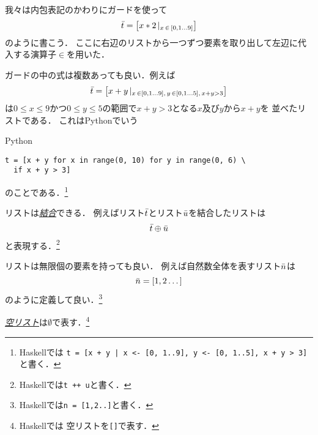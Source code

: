 \documentclass[a5paper,draft]{jsbook}
\newcommand{\programminglanguage}[1]{\textsf{#1}}
\newcommand{\haskell}{\programminglanguage{Haskell}}
\newcommand{\python}{\programminglanguage{Python}}
\newcommand{\keyword}[1]{{\underline{\emph{#1}}}}
\newcommand{\code}[1]{\texttt{#1}}
\newenvironment{pythoncode}{\begin{itembox}[r]{\python}}{\end{itembox}}
\newcommand{\pthnId}[1]{\textit{#1}}
\newcommand{\pthnKeyword}[1]{\textbf{#1}}
\newcommand{\pthnOp}[1]{\texttt{#1}}
\newcommand{\mathListVar}[1]{\Bar{#1}}
\newcommand{\mathGuard}[1]{\mathop{\mid_{#1}}}
\newcommand{\mathBinaryOperator}[1]{\operatorname{#1}}
\newcommand{\mathAppend}{\oplus}
\newcommand{\mathFrom}{\mathBinaryOperator{\in}}
\newcommand{\hsklEmptyList}{\emptyset}
\begin{document}
我々は内包表記のかわりにガードを使って
\begin{equation}
\mathListVar{t}=\left[x*2\mathGuard{x\mathFrom{[0,1\dots9]}}\right]
\end{equation}
のように書こう．
ここに右辺のリストから一つずつ要素を取り出して左辺に代入する演算子$\mathFrom$を用いた．

ガードの中の式は複数あっても良い．例えば
\begin{equation}
\mathListVar{t}=\left[x+y\mathGuard{x\mathFrom[0,1\dots9],\,y\mathFrom[0,1\dots5],\,x+y>3}\right]
\end{equation}
は$0\le x\le9$かつ$0\le y\le5$の範囲で$x+y>3$となる$x$及び$y$から$x+y$を
並べたリストである．
これは\python でいう
\begin{pythoncode}
\begin{verbatim}
t = [x + y for x in range(0, 10) for y in range(0, 6) \
  if x + y > 3]
\end{verbatim}
\end{pythoncode}
のことである．\footnote{\haskell では
\code{t = [x + y | x <- [0, 1..9], y <- [0, 1..5], x + y > 3]}と書く．}

リストは\keyword{結合}できる．
例えばリスト$\mathListVar{t}$とリスト$\mathListVar{u}$を結合したリストは
\begin{equation}
\mathListVar{t}\mathAppend\mathListVar{u}
\end{equation}
と表現する．\footnote{\haskell では\code{t ++ u}と書く．}

リストは無限個の要素を持っても良い．
例えば自然数全体を表すリスト$\mathListVar{n}$は
\begin{equation}
\mathListVar{n}=[1,2\dots]
\end{equation}
のように定義して良い．\footnote{\haskell では\code{n = [1,2..]}と書く．}

\keyword{空リスト}は$\hsklEmptyList$で表す．\footnote{\haskell では
空リストを\code{[]}で表す．}
\end{document}
